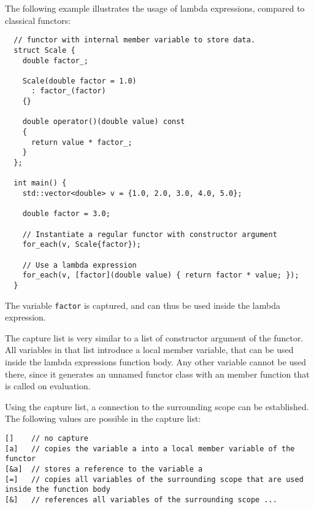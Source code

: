 \begin{example}
  The following example illustrates the usage of lambda expressions, compared to classical functors:
  \begin{verbatim}
  // functor with internal member variable to store data.
  struct Scale {
    double factor_;

    Scale(double factor = 1.0)
      : factor_(factor)
    {}

    double operator()(double value) const
    {
      return value * factor_;
    }
  };

  int main() {
    std::vector<double> v = {1.0, 2.0, 3.0, 4.0, 5.0};

    double factor = 3.0;

    // Instantiate a regular functor with constructor argument
    for_each(v, Scale{factor});

    // Use a lambda expression
    for_each(v, [factor](double value) { return factor * value; });
  }
  \end{verbatim}
  The variable \texttt{factor} is captured, and can thus be used inside the lambda expression.
\end{example}

The capture list is very similar to a list of constructor argument of the functor. All variables in that list introduce a local
member variable, that can be used inside the lambda expressions function body. Any other variable cannot be used there, since it
generates an unnamed functor class with an  member function that is called on evaluation.

Using the capture list, a connection to the surrounding scope can be established. The following values are possible in the capture list:
\begin{verbatim}
[]    // no capture
[a]   // copies the variable a into a local member variable of the functor
[&a]  // stores a reference to the variable a
[=]   // copies all variables of the surrounding scope that are used inside the function body
[&]   // references all variables of the surrounding scope ...
\end{verbatim}



